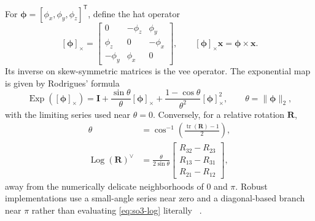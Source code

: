 \documentclass[11pt,oneside,headings=big]{scrreprt}
\newcommand{\Exp}{\operatorname{Exp}}
\newcommand{\Log}{\operatorname{Log}}
\newcommand{\skewmat}[1]{\left[#1\right]_{\times}}
\newcommand{\tr}{\operatorname{tr}}
\newcommand{\transpose}{\mathsf{T}}
\newcommand{\vect}[1]{\bm{#1}}
\newcommand{\mat}[1]{\bm{#1}}
\begin{document}
    For \(\vect\phi=[\phi_x,\phi_y,\phi_z]^\transpose\), define the hat operator
    \begin{equation}
        \skewmat{\vect\phi}=
        \begin{bmatrix}
            0 & -\phi_z & \phi_y\\
            \phi_z & 0 & -\phi_x\\
            -\phi_y & \phi_x & 0
        \end{bmatrix},
        \qquad
        \skewmat{\vect\phi}\vect x=\vect\phi\times\vect x.
    \end{equation}
    Its inverse on skew-symmetric matrices is the vee operator. The exponential map
    is given by Rodrigues' formula
    \begin{equation}
        \Exp\!\left(\skewmat{\vect\phi}\right)
        =\mat I
        +\frac{\sin\theta}{\theta}\skewmat{\vect\phi}
        +\frac{1-\cos\theta}{\theta^2}\skewmat{\vect\phi}^{2},
        \qquad \theta=\lVert\vect\phi\rVert_2,
        \label{eq:rodrigues}
    \end{equation}
    with the limiting series used near \(\theta=0\). Conversely, for a relative
    rotation \(\mat R\),
    \begin{align}
        \theta &= \cos^{-1}\!\left(\frac{\tr(\mat R)-1}{2}\right),\\
        \Log(\mat R)^\vee
        &=\frac{\theta}{2\sin\theta}
        \begin{bmatrix}
            R_{32}-R_{23}\\
            R_{13}-R_{31}\\
            R_{21}-R_{12}
        \end{bmatrix},
        \label{eq:so3-log}
    \end{align}
    away from the numerically delicate neighborhoods of \(0\) and \(\pi\). Robust
    implementations use a small-angle series near zero and a diagonal-based branch
    near \(\pi\) rather than evaluating \cref{eq:so3-log} literally
    ~\cite{sola2017,barfoot2017}.
\end{document}
